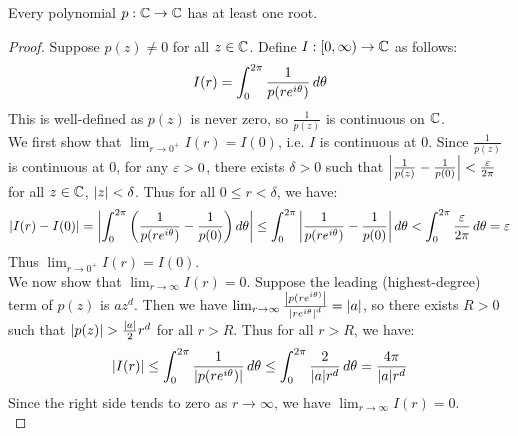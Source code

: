 \documentclass[main.tex]{subfiles}
\begin{document}
\begin{theorem}
    Every polynomial $p:\C\to\C$ has at least one root.
\end{theorem}
\begin{proof}
    Suppose $p(z)\ne 0$ for all $z\in\C$. Define $I:[0,\infty)\to\C$ as follows:
    \begin{equation*}
        I(r) = \int_0^{2\pi} \frac{1}{p(re^{i\theta})}\,d\theta
    \end{equation*}
    This is well-defined as $p(z)$ is never zero, so $\frac{1}{p(z)}$ is continuous on $\C$.\\

    We first show that $\lim_{r\to 0^+} I(r)=I(0)$, i.e. $I$ is continuous at $0$. Since $\frac{1}{p(z)}$ is continuous at $0$, for any $\varepsilon>0$, there exists $\delta>0$ such that $\abs{\frac{1}{p(z)}-\frac{1}{p(0)}}<\frac{\varepsilon}{2\pi}$ for all $z\in\C$, $\abs{z}<\delta$. Thus for all $0\le r<\delta$, we have:
    \begin{equation*}
        \abs{I(r)-I(0)}
        = \abs{\int_0^{2\pi} \qty(\frac{1}{p(re^{i\theta})}-\frac{1}{p(0)})\,d\theta}
        \le \int_0^{2\pi} \abs{\frac{1}{p(re^{i\theta})}-\frac{1}{p(0)}}\,d\theta
        < \int_0^{2\pi} \frac{\varepsilon}{2\pi}\,d\theta
        = \varepsilon
    \end{equation*}
    Thus $\lim_{r\to 0^+} I(r)=I(0)$.\\

    We now show that $\lim_{r\to\infty} I(r)=0$. Suppose the leading (highest-degree) term of $p(z)$ is $az^d$. Then we have $\lim_{r\to\infty} \frac{\abs{p(re^{i\theta)}}}{\abs{re^{i\theta}}^d}=\abs{a}$, so there exists $R>0$ such that $\abs{p(z)}>\frac{\abs{a}}{2}r^d$ for all $r>R$. Thus for all $r>R$, we have:
    \begin{equation*}
        \abs{I(r)}
        \le \int_0^{2\pi} \frac{1}{\abs{p(re^{i\theta})}}\,d\theta
        \le \int_0^{2\pi} \frac{2}{\abs{a}r^d}\,d\theta
        = \frac{4\pi}{\abs{a}r^d}
    \end{equation*}
    Since the right side tends to zero as $r\to\infty$, we have $\lim_{r\to\infty} I(r)=0$.\\


\end{proof}
\end{document}
